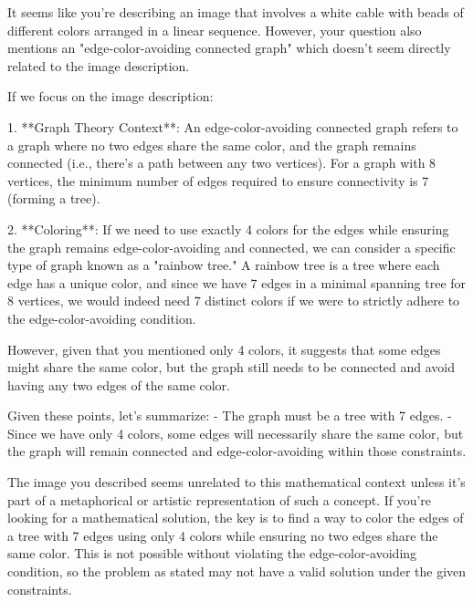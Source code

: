 It seems like you're describing an image that involves a white cable with beads of different colors arranged in a linear sequence. However, your question also mentions an "edge-color-avoiding connected graph" which doesn't seem directly related to the image description.

If we focus on the image description:

1. **Graph Theory Context**: An edge-color-avoiding connected graph refers to a graph where no two edges share the same color, and the graph remains connected (i.e., there's a path between any two vertices). For a graph with 8 vertices, the minimum number of edges required to ensure connectivity is 7 (forming a tree).

2. **Coloring**: If we need to use exactly 4 colors for the edges while ensuring the graph remains edge-color-avoiding and connected, we can consider a specific type of graph known as a "rainbow tree." A rainbow tree is a tree where each edge has a unique color, and since we have 7 edges in a minimal spanning tree for 8 vertices, we would indeed need 7 distinct colors if we were to strictly adhere to the edge-color-avoiding condition.

However, given that you mentioned only 4 colors, it suggests that some edges might share the same color, but the graph still needs to be connected and avoid having any two edges of the same color.

Given these points, let's summarize:
- The graph must be a tree with 7 edges.
- Since we have only 4 colors, some edges will necessarily share the same color, but the graph will remain connected and edge-color-avoiding within those constraints.

The image you described seems unrelated to this mathematical context unless it's part of a metaphorical or artistic representation of such a concept. If you're looking for a mathematical solution, the key is to find a way to color the edges of a tree with 7 edges using only 4 colors while ensuring no two edges share the same color. This is not possible without violating the edge-color-avoiding condition, so the problem as stated may not have a valid solution under the given constraints.